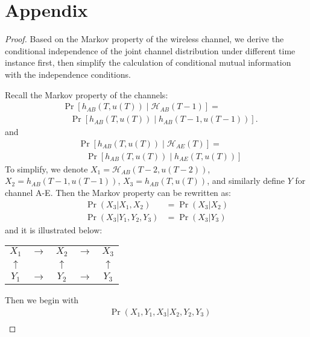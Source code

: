 \newpage
\section*{Appendix}
\begin{proof}
Based on the Markov property of the wireless channel, we derive the conditional independence of the joint channel distribution under different time instance first, then simplify the calculation of conditional mutual information with the independence conditions.

Recall the Markov property of the channels:
\begin{equation*}
\begin{split}
& \Pr\left[h_{AB}\left(T, u(T)\right)\mid \mathcal{H}_{AB}(T-1)\right] = \\
& \ \ \ \ \Pr\left[h_{AB}\left(T, u(T) \right) \mid h_{AB}\left(T-1, u(T-1)\right)\right].
\end{split}
\end{equation*}
and
\begin{equation*}
\begin{split}
& \Pr\left[h_{AB}\left(T,u(T)\right)\mid \mathcal{H}_{AE}(T)\right] = \\
& \ \ \ \ \Pr\left[h_{AB}\left(T, u(T) \right) \mid h_{AE}\left(T, u(T)\right)\right]
\end{split}
\end{equation*}
To simplify, we denote $X_1 = \mathcal{H}_{AB}(T-2,u(T-2))$, $X_2 = h_{AB}(T-1,u(T-1))$, $X_3 = h_{AB}(T,u(T))$, and similarly define $Y$ for channel A-E. Then the Markov property can be rewritten as:
\begin{align*}
    \Pr(X_3|X_1,X_2) & = \Pr(X_3|X_2)\\
    \Pr(X_3|Y_1,Y_2,Y_3) & = \Pr(X_3|Y_3)
\end{align*}
and it is illustrated below:
\begin{center}
\begin{tabular}{ c c c c c}
 $X_1$ & $\longrightarrow$ & $X_2$ & $\longrightarrow$ & $X_3$ \\ 
 $\uparrow$ &  & $\uparrow$ &  & $\uparrow$ \\
 $Y_1$ & $\longrightarrow$ & $Y_2$ & $\longrightarrow$ & $Y_3$
\end{tabular}
\end{center}
Then we begin with
\begin{subequations}
    \begin{align*}
        &\Pr(X_1,Y_1,X_3|X_2,Y_2,Y_3)\\

\end{align*}
\end{subequations}
\end{proof}
